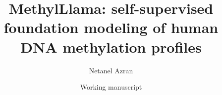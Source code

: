 \documentclass[11pt]{article}
\title{MethylLlama: self-supervised foundation modeling of human DNA methylation profiles}
\author{Netanel Azran}
\date{Working manuscript}
\begin{document}
\maketitle
\linenumbers
\onehalfspacing

\begin{abstract}

\end{abstract}



\clearpage












\end{document}
